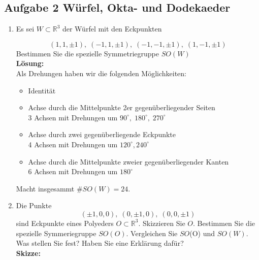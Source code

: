 \documentclass[11pt,a4paper,ngerman]{article}
\newcommand{\R}{\mathbb{R}}
\begin{document}
\subsection*{Aufgabe 2 \mdseries Würfel, Okta- und Dodekaeder}

\begin{enumerate}[\bfseries (a)]

\item Es sei $W \subset \R ^3$ der Würfel mit den Eckpunkten

$$
(1,1,\pm 1), \; (-1,1, \pm 1), \; (-1, -1, \pm 1), \; (1, -1, \pm 1)
$$
Bestimmen Sie die spezielle Symmetriegruppe $SO(W)$\\


\textbf{Lösung:}\\
Als Drehungen haben wir die folgenden Möglichkeiten:
\begin{itemize}
\item Identität
\item Achse durch die Mittelpunkte 2er gegenüberliegender Seiten\\
3 Achsen mit Drehungen um $90^\circ, \; 180^\circ , \; 270^\circ$
\item Achse durch zwei gegenüberliegende Eckpunkte\\
4 Achsen mit Drehungen um $120^\circ , 240^\circ$
\item Achse durch die Mittelpunkte zweier gegenüberliegender Kanten\\
6 Achsen mit Drehungen um $180^\circ$
\end{itemize}

Macht insgesammt $\# SO(W) = 24$.

\item Die Punkte
$$
(\pm 1, 0 , 0), \; (0, \pm 1, 0), \; (0,0,\pm 1)
$$
sind Eckpunkte eines Polyeders $O \subset \R ^ 3$. Skizzieren Sie $O$. Bestimmen Sie die spezielle Symmeriegruppe $SO(O)$. Vergleichen Sie $SO$(O) und $SO(W)$. Was stellen Sie fest? Haben Sie eine Erklärung dafür?\\

\textbf{Skizze:}

\pagebreak


\end{enumerate}
\end{document}

